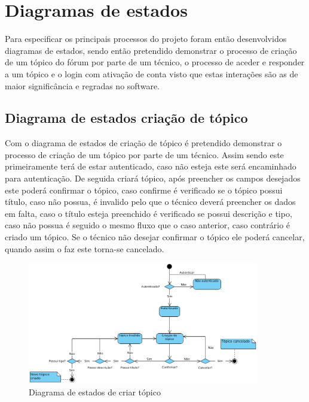 \section{Diagramas de estados}
Para especificar os principais processos do projeto foram então desenvolvidos diagramas de estados,
sendo então pretendido demonstrar o processo de criação de um tópico do fórum por parte de um técnico, o 
processo de aceder e responder a um tópico e o login com ativação de conta
visto que estas interações são as de maior significância e regradas no software.

\subsection{Diagrama de estados criação de tópico}

Com o diagrama de estados de criação de tópico é pretendido demonstrar o processo de criação de um tópico 
por parte de um técnico. Assim sendo este primeiramente terá de estar autenticado, caso não esteja 
este será encaminhado para autenticação. De seguida criará tópico, após preencher os 
campos desejados este poderá confirmar o tópico, caso confirme é verificado se o tópico possui título, 
caso não possua, é invalido pelo que o técnico deverá preencher os dados em falta, caso o 
título esteja preenchido é verificado se possui descrição e tipo, caso não possua é seguido o mesmo fluxo que o 
caso anterior, caso contrário é criado um tópico. Se o técnico não desejar confirmar o tópico ele 
poderá cancelar, quando assim o faz este torna-se cancelado.

\begin{figure}[htb]
    \centering
    \includegraphics[width=0.9\textwidth]{images/diagramas/estados/criar_topico.png}
    \caption{Diagrama de estados de criar tópico}
    \label{fig:27}
\end{figure}

\newpage

